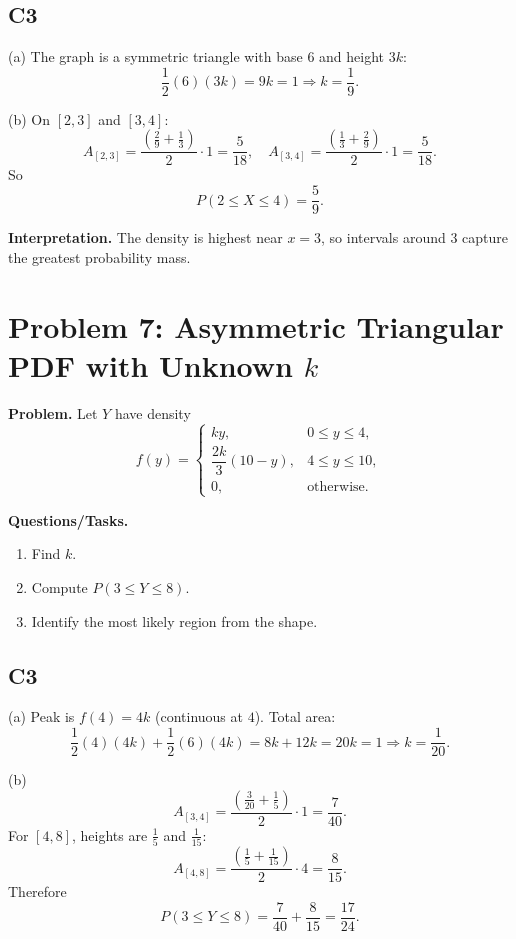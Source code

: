 \subsection*{C3}
(a) The graph is a symmetric triangle with base $6$ and height $3k$:
\[
\frac12(6)(3k)=9k=1\Rightarrow k=\frac19.
\]

(b) On $[2,3]$ and $[3,4]$:
\[
A_{[2,3]}=\frac{\left(\frac29+\frac13\right)}{2}\cdot1=\frac{5}{18},
\quad
A_{[3,4]}=\frac{\left(\frac13+\frac29\right)}{2}\cdot1=\frac{5}{18}.
\]
So
\[
P(2\le X\le 4)=\frac{5}{9}.
\]

\textbf{Interpretation.}
The density is highest near $x=3$, so intervals around $3$ capture the greatest probability mass.

\section{Problem 7: Asymmetric Triangular PDF with Unknown $k$}

\textbf{Problem.}
Let $Y$ have density
\[
f(y)=\begin{cases}
ky, & 0\le y\le 4,\\
\dfrac{2k}{3}(10-y), & 4\le y\le 10,\\
0, & \text{otherwise.}
\end{cases}
\]

\textbf{Questions/Tasks.}
\begin{enumerate}
\item Find $k$.
\item Compute $P(3\le Y\le 8)$.
\item Identify the most likely region from the shape.
\end{enumerate}

\subsection*{C3}
(a) Peak is $f(4)=4k$ (continuous at $4$).
Total area:
\[
\frac12(4)(4k)+\frac12(6)(4k)=8k+12k=20k=1\Rightarrow k=\frac1{20}.
\]

(b)
\[
A_{[3,4]}=\frac{\left(\frac3{20}+\frac15\right)}{2}\cdot1=\frac7{40}.
\]
For $[4,8]$, heights are $\frac15$ and $\frac1{15}$:
\[
A_{[4,8]}=\frac{\left(\frac15+\frac1{15}\right)}{2}\cdot4=\frac{8}{15}.
\]
Therefore
\[
P(3\le Y\le 8)=\frac7{40}+\frac{8}{15}=\frac{17}{24}.
\]

